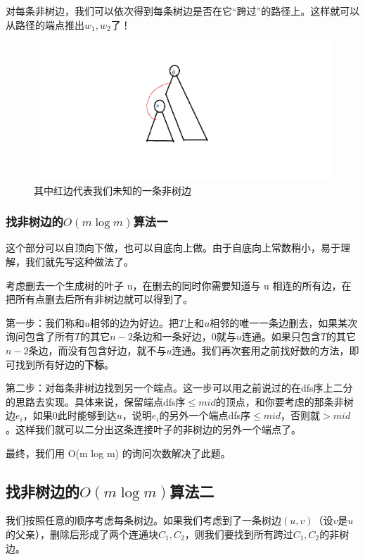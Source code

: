 \documentclass{noithesis}
\begin{document}
对每条非树边，我们可以依次得到每条树边是否在它“跨过”的路径上。这样就可以从路径的端点推出$w_1, w_2$了！

\begin{figure}[htbp]
\centering
\includegraphics[scale=0.45]{graph6.png}
\caption{其中红边代表我们未知的一条非树边}     \label{fig:ss}
\end{figure}

\newpage

\subsubsection{找非树边的$O(m \log m)$算法一}


这个部分可以自顶向下做，也可以自底向上做。由于自底向上常数稍小，易于理解，我们就先写这种做法了。

考虑删去一个生成树的叶子 u，在删去的同时你需要知道与 u 相连的所有边，在把所有点删去后所有非树边就可以得到了。


第一步：我们称和$u$相邻的边为好边。把$T$上和$u$相邻的唯一一条边删去，如果某次询问包含了所有$T$的其它$n - 2$条边和一条好边，$0$就与$u$连通。如果只包含$T$的其它$n - 2$条边，而没有包含好边，就不与$u$连通。我们再次套用之前找好数的方法，即可找到所有好边的\textbf{下标}。


第二步：对每条非树边找到另一个端点。这一步可以用之前说过的在dfs序上二分的思路去实现。具体来说，保留端点dfs序$\leq mid$的顶点，和你要考虑的那条非树边$e_i$，如果$0$此时能够到达$u$，说明$e_i$的另外一个端点dfs序$\leq mid$，否则就$> mid$。这样我们就可以二分出这条连接叶子的非树边的另外一个端点了。


最终，我们用 O(m log m) 的询问次数解决了此题。

\subsection{找非树边的$O(m \log m)$算法二}

我们按照任意的顺序考虑每条树边。如果我们考虑到了一条树边$(u, v)$（设$v$是$u$的父亲），删除后形成了两个连通块$C_1,C_2$，则我们要找到所有跨过$C_1, C_2$的非树边。
\end{document}

